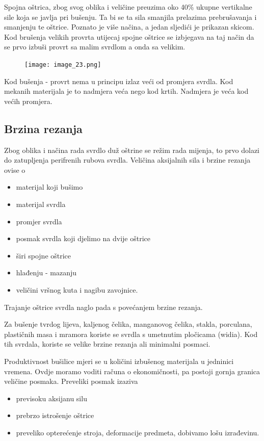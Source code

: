 \documentclass[a4paper,12pt]{article}
\numberwithin{figure}{section}
\begin{document}
Spojna oštrica, zbog svog oblika i veličine preuzima oko 40\% ukupne vertikalne sile koja se javlja pri bušenju. Ta bi se ta sila smanjila prelazima prebrušavanja i smanjenju te oštrice. Poznato je više načina, a jedan sljedići je prikazan skicom.
Kod brušenja velikih provrta utijecaj spojne oštrice se izbjegava na taj način da se prvo izbuši provrt sa malim svrdlom a onda sa velikim.
\begin{figure}[!h]
\centering
\texttt{[image: image\_23.png]}
\end{figure}
\FloatBarrier
Kod bušenja - provrt nema u principu izlaz veći od promjera svrdla. Kod mekanih materijala je to nadmjera veća nego kod krtih. Nadmjera je veća kod većih promjera.
\subsection{Brzina rezanja}
Zbog oblika i načina rada svrdlo duž oštrine se režim rada mijenja, to prvo dolazi do zatupljenja perifrenih rubova svrdla. Veličina aksijalnih sila i brzine rezanja ovise o 
\begin{itemize}
\item materijal koji bušimo
\item materijal svrdla
\item promjer svrdla
\item posmak svrdla koji djelimo na dvije oštrice
\item širi spojne oštrice 
\item hlađenju - mazanju
\item veličini vršnog kuta i nagibu zavojnice.
\end{itemize}
Trajanje oštrice svrdla naglo pada s povećanjem brzine rezanja.\par
Za bušenje tvrdog lijeva, kaljenog čelika, manganovog čelika, stakla, porculana, plastičnih masa i mramora koriste se svrdla s umetnutim pločicama (widia). Kod tih svrdala, koriste se velike brzine rezanja ali minimalni posmaci.\par
Produktivnost bušilice mjeri se u količini izbušenog materijala u jedninici vremena. Ovdje moramo voditi računa o ekonomičnosti, pa postoji gornja granica veličine posmaka. Preveliki posmak izaziva
\begin{itemize}
\item previsoku aksijanu silu
\item prebrzo istrošenje oštrice
\item preveliko opterećenje stroja, deformacije predmeta, dobivamo lošu izrađevinu.
\end{itemize}
\end{document}
